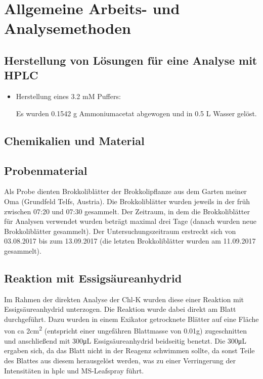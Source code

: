 \chapter{Allgemeine Arbeits- und Analysemethoden}

\section{Herstellung von Lösungen für eine Analyse mit HPLC}

\begin{itemize}
\item Herstellung eines 3.2 mM  Puffers:

Es wurden 0.1542 g Ammoniumacetat abgewogen und in 0.5 L Wasser gelöst.

\end{itemize}

\section{Chemikalien und Material}

\section{Probenmaterial}

Als Probe dienten Brokkoliblätter der Brokkolipflanze aus dem Garten meiner Oma (Grundfeld Telfs, Austria). Die Brokkoliblätter wurden jeweils in der früh zwischen 07:20 und 07:30 gesammelt. Der Zeitraum, in dem die Brokkoliblätter für Analysen verwendet wurden beträgt maximal drei Tage (danach wurden neue Brokkoliblätter gesammelt). Der Untersuchungszeitraum erstreckt sich von 03.08.2017 bis zum 13.09.2017 (die letzten Brokkoliblätter wurden am 11.09.2017 gesammelt).\\

\section{Reaktion mit Essigsäureanhydrid}

Im Rahmen der direkten Analyse der \gls{Chl-K} wurden diese einer Reaktion mit Essigsäureanhydrid unterzogen. Die Reaktion wurde dabei direkt am Blatt durchgeführt. Dazu wurden in einem Exikator getrocknete Blätter auf eine Fläche von \gls{ca} 2cm\textsuperscript{2} (entspricht einer ungefähren Blattmasse von 0.01g) zugeschnitten und anschließend mit 300\si{\uL} Essigsäureanhydrid beidseitig benetzt. Die 300\si{\uL} ergaben sich, da das Blatt nicht in der Reagenz schwimmen sollte, da sonst Teile des Blattes aus diesem herausgelöst werden, was zu einer Verringerung der Intensitäten in \gls{hplc} und MS-Leafspray führt. 

